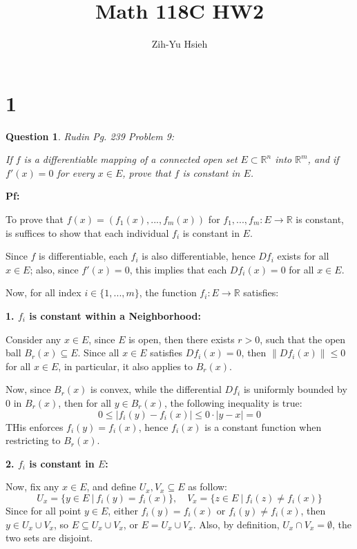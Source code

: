 \documentclass{article}
\title{Math 118C HW2}
\author{Zih-Yu Hsieh}
\newtheorem{question}{Question}
\begin{document}
\maketitle

\section*{1}
\begin{myBox}[]{}
    \begin{question}
        Rudin Pg. 239 Problem 9:

        If $f$ is a differentiable mapping of a \emph{connected} open set $E\subset \mathbb{R}^n$ into $\mathbb{R}^m$, and if $f'(x)=0$ for every $x\in E$, prove that $f$ is constant in $E$.
    \end{question}
\end{myBox}

\textbf{Pf:}

To prove that $f(x)=(f_1(x),...,f_m(x))$ for $f_1,...,f_m:E\rightarrow\mathbb{R}$ is constant, is suffices to show that each individual $f_i$ is constant in $E$.

Since $f$ is differentiable, each $f_i$ is also differentiable, hence $Df_i$ exists for all $x\in E$; also, since $f'(x)=0$, this implies that each $Df_i(x)=0$ for all $x\in E$.

Now, for all index $i\in\{1,...,m\}$, the function $f_i:E\rightarrow \mathbb{R}$ satisfies:

\hfil

\textbf{1. $f_i$ is constant within a Neighborhood:}

Consider any $x\in E$, since $E$ is open, then there exists $r>0$, such that the open ball $B_r(x)\subseteq E$.
Since all $x\in E$ satisfies $Df_i(x)=0$, then $\|Df_i(x)\|\leq 0$ for all $x\in E$, in particular, it also applies to $B_r(x)$.

Now, since $B_r(x)$ is convex, while the differential $Df_i$ is uniformly bounded by $0$ in $B_r(x)$, then for all $y\in B_r(x)$, the following inequality is true:
$$0\leq |f_i(y)-f_i(x)| \leq 0\cdot |y-x| = 0$$
THis enforces $f_i(y)=f_i(x)$, hence $f_i(x)$ is a constant function when restricting to $B_r(x)$.

\hfil

\textbf{2. $f_i$ is constant in $E$:}

Now, fix any $x\in E$, and define $U_x, V_x\subseteq E$ as follow:
$$U_x=\{y\in E\ |\ f_i(y)=f_i(x)\},\quad V_x=\{z\in E\ |\ f_i(z)\neq f_i(x)\}$$
Since for all point $y\in E$, either $f_i(y)=f_i(x)$ or $f_i(y)\neq f_i(x)$, then $y\in U_x\cup V_x$, so $E\subseteq U_x\cup V_x$, or $E=U_x\cup V_x$. Also, by definition, $U_x\cap V_x = \emptyset$, the two sets are disjoint.
\end{document}
